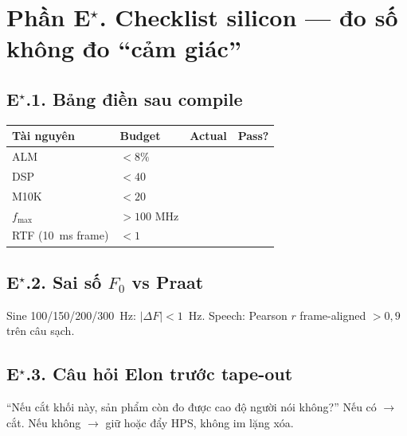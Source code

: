 
\newpage
\section*{Phần E$^\star$. Checklist silicon --- đo số không đo ``cảm giác''}

\subsection*{E$^\star$.1. Bảng điền sau compile}
\begin{center}\small
\begin{tabular}{@{}lp{3cm}p{3cm}p{3cm}@{}}
\toprule
Tài nguyên & Budget & Actual & Pass? \\
\midrule
ALM & $<8\%$ & & \\
DSP & $<40$ & & \\
M10K & $<20$ & & \\
$f_{\max}$ & $>100$ MHz & & \\
RTF (10~ms frame) & $<1$ & & \\
\bottomrule
\end{tabular}
\end{center}

\subsection*{E$^\star$.2. Sai số $F_0$ vs Praat}
Sine 100/150/200/300~Hz: $|\Delta F|<1$~Hz. Speech: Pearson $r$ frame-aligned $>0{,}9$ trên câu sạch.

\subsection*{E$^\star$.3. Câu hỏi Elon trước tape-out}
``Nếu cắt khối này, sản phẩm còn đo được cao độ người nói không?'' Nếu có $\to$ cắt. Nếu không $\to$ giữ hoặc đẩy HPS, không im lặng xóa.
